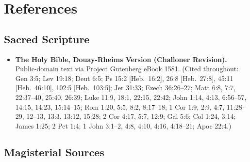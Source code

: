 \section{References}

\subsection*{Sacred Scripture}

\begin{itemize}
\item \textbf{The Holy Bible, Douay-Rheims Version (Challoner Revision).} Public-domain text via Project Gutenberg eBook 1581. (Cited throughout: Gen 3:5; Lev 19:18; Deut 6:5; Ps 15:2 [Heb.\ 16:2], 26:8 [Heb.\ 27:8], 45:11 [Heb.\ 46:10], 102:5 [Heb.\ 103:5]; Jer 31:33; Ezech 36:26--27; Matt 6:8, 7:7, 22:37--40, 25:40, 26:39; Luke 11:9, 18:1, 22:15, 22:42; John 1:14, 4:13, 6:56--57, 14:15, 14:23, 15:14--15; Rom 1:20, 5:5, 8:2, 8:17--18; 1 Cor 1:9, 2:9, 4:7, 11:28--29, 12--13, 13:3, 13:12, 15:28; 2 Cor 4:17, 5:7, 12:9; Gal 5:6; Col 1:24, 3:14; James 1:25; 2 Pet 1:4; 1 John 3:1--2, 4:8, 4:10, 4:16, 4:18--21; Apoc 22:4.)
\end{itemize}

\subsection*{Magisterial Sources}

